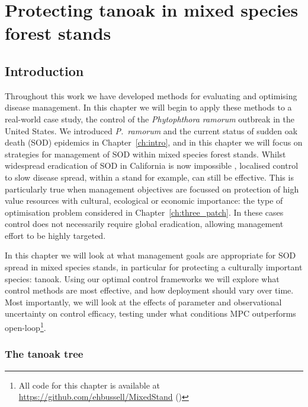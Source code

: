 %
\chapter{Protecting tanoak in mixed species forest stands\label{ch:protect_tanoak}}

\section{Introduction\label{sec:ch5:Intro}}


Throughout this work we have developed methods for evaluating and optimising disease management. In this chapter we will begin to apply these methods to a real-world case study, the control of the \textit{Phytophthora ramorum} outbreak in the United States. We introduced \textit{P.~ramorum} and the current status of sudden oak death (SOD) epidemics in Chapter~\ref{ch:intro}, and in this chapter we will focus on strategies for management of SOD within mixed species forest stands. Whilst widespread eradication of SOD in California is now impossible \citep{cunniffe_modelling_2016}, localised control to slow disease spread, within a stand for example, can still be effective.  This is particularly true when management objectives are focussed on protection of high value resources with cultural, ecological or economic importance: the type of optimisation problem considered in Chapter~\ref{ch:three_patch}. In these cases control does not necessarily require global eradication, allowing management effort to be highly targeted.

In this chapter we will look at what management goals are appropriate for SOD spread in mixed species stands, in particular for protecting a culturally important species: tanoak. Using our optimal control frameworks we will explore what control methods are most effective, and how deployment should vary over time. Most importantly, we will look at the effects of parameter and observational uncertainty on control efficacy, testing under what conditions MPC outperforms open-loop\footnote{All code for this chapter is available at \url{https://github.com/ehbussell/MixedStand} ()}.

\subsection{The tanoak tree}

